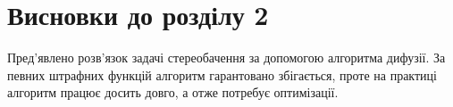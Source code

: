 
\section*{Висновки до розділу 2}

Пред'явлено розв'язок задачі стереобачення за допомогою алгоритма дифузії.
За певних штрафних функцій алгоритм гарантовано збігається,
проте на практиці алгоритм працює досить довго, а отже потребує оптимізації.
